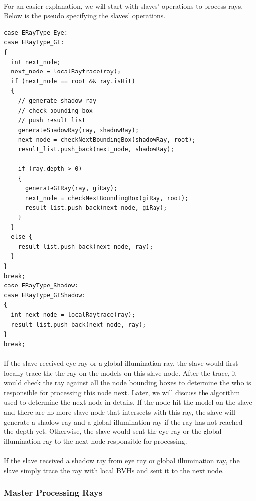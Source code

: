 \documentclass[a4paper, oneside, 10pt]{article}
\begin{document}
\paragraph{} For an easier explanation, we will start with slaves' operations to process rays.  Below is the pseudo specifying the slaves' operations.
\begin{lstlisting}[frame=single] 
case ERayType_Eye:
case ERayType_GI:
{
  int next_node;
  next_node = localRaytrace(ray);
  if (next_node == root && ray.isHit)
  {
    // generate shadow ray
    // check bounding box
    // push result list
    generateShadowRay(ray, shadowRay);
    next_node = checkNextBoundingBox(shadowRay, root);
    result_list.push_back(next_node, shadowRay);

    if (ray.depth > 0)
    {
      generateGIRay(ray, giRay);
      next_node = checkNextBoundingBox(giRay, root);
      result_list.push_back(next_node, giRay);
    }
  }
  else {
    result_list.push_back(next_node, ray);
  }
}
break;
case ERayType_Shadow:
case ERayType_GIShadow:
{
  int next_node = localRaytrace(ray);
  result_list.push_back(next_node, ray);
}
break;
\end{lstlisting}

\paragraph{} If the slave received eye ray or a global illumination ray, the slave would first locally trace the the ray on the models on this slave node. After the trace, it would check the ray against all the node bounding boxes to determine the who is responsible for processing this node next. Later, we will discuss the algorithm used to determine the next node in details.  If the node hit the model on the slave and there are no more slave node that intersects with this ray, the slave will generate a shadow ray and a global illumination ray if the ray has not reached the depth yet. Otherwise, the slave would sent the eye ray or the global illumination ray to the next node responsible for processing.

\paragraph{} If the slave received a shadow ray from eye ray or global illumination ray, the slave simply trace the ray with local BVHs and sent it to the next node.

\subsubsection{Master Processing Rays}
\end{document}
